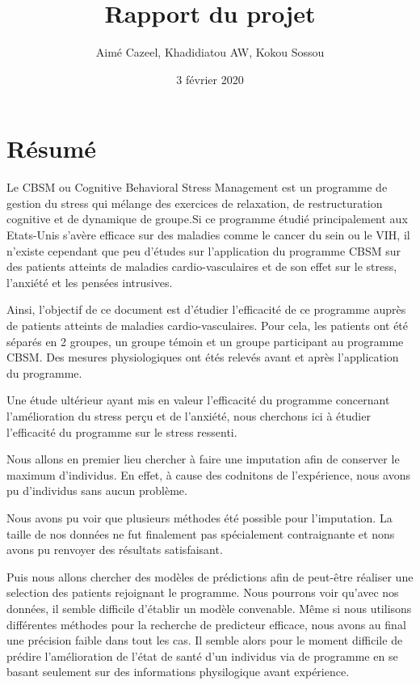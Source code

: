 \documentclass[]{article}
\title{Rapport du projet}
\author{Aimé Cazeel, Khadidiatou AW, Kokou Sossou}
\date{3 février 2020}
\begin{document}
\maketitle

{
\setcounter{tocdepth}{2}
\tableofcontents
}
\newpage

\hypertarget{ruxe9sumuxe9}{%
\section{Résumé}\label{ruxe9sumuxe9}}

Le CBSM ou Cognitive Behavioral Stress Management est un programme de
gestion du stress qui mélange des exercices de relaxation, de
restructuration cognitive et de dynamique de groupe.Si ce programme
étudié principalement aux Etats-Unis s'avère efficace sur des maladies
comme le cancer du sein ou le VIH, il n'existe cependant que peu
d'études sur l'application du programme CBSM sur des patients atteints
de maladies cardio-vasculaires et de son effet sur le stress, l'anxiété
et les pensées intrusives.

Ainsi, l'objectif de ce document est d'étudier l'efficacité de ce
programme auprès de patients atteints de maladies cardio-vasculaires.
Pour cela, les patients ont été séparés en 2 groupes, un groupe témoin
et un groupe participant au programme CBSM. Des mesures physiologiques
ont étés relevés avant et après l'application du programme.

Une étude ultérieur ayant mis en valeur l'efficacité du programme
concernant l'amélioration du stress perçu et de l'anxiété, nous
cherchons ici à étudier l'efficacité du programme sur le stress
ressenti.

Nous allons en premier lieu chercher à faire une imputation afin de
conserver le maximum d'individus. En effet, à cause des codnitons de
l'expérience, nous avons pu d'individus sans aucun problème.

Nous avons pu voir que plusieurs méthodes été possible pour
l'imputation. La taille de nos données ne fut finalement pas
spécialement contraignante et nons avons pu renvoyer des résultats
satisfaisant.

Puis nous allons chercher des modèles de prédictions afin de peut-être
réaliser une selection des patients rejoignant le programme. Nous
pourrons voir qu'avec nos données, il semble difficile d'établir un
modèle convenable. Même si nous utilisons différentes méthodes pour la
recherche de predicteur efficace, nous avons au final une précision
faible dans tout les cas. Il semble alors pour le moment difficile de
prédire l'amélioration de l'état de santé d'un individus via de
programme en se basant seulement sur des informations physilogique avant
expérience.
\end{document}
